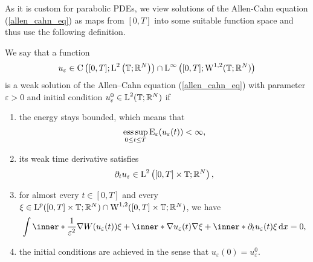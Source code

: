 As it is custom for parabolic PDEs, we view solutions of the Allen-Cahn equation (\ref{allen_cahn_eq}) as maps from $ [0,T] $ into some suitable function space and thus use the following definition.

\begin{definition}
	\label{solution_to_ac}
	We say that a function 
	\begin{equation*}
	u_{ \varepsilon} \in 
	\mathrm{ C } \left( [0 , T ] ; \operatorname{L}^{ 2 } \left( \operatorname{\mathbb{T}}; \mathbb{ R }^{ 
	N } \right) \right) \cap
	\operatorname{L}^{ \infty } \left( [0, T ]; \operatorname{W}^{ 1, 2 } ( \operatorname{\mathbb{T}} ; \mathbb{ R }^{ 
	N } ) \right)
	\end{equation*}
	is a weak solution of the Allen--Cahn equation (\ref{allen_cahn_eq}) with parameter $ \varepsilon > 0 $ and initial condition $ u_{ \varepsilon}^{ 0 } \in \operatorname{L}^{ 2 } ( \operatorname{\mathbb{T}} ; \mathbb{ R }^{ N } ) $ if
	\begin{enumerate}
		\item the energy stays bounded, which means that
		\begin{equation}
			\operatorname*{ess\,sup}_{ 0 \leq t \leq T }
			\operatorname{E}_{ \varepsilon } ( u_{ \varepsilon } ( t ) ) 
			< \infty,
		\end{equation}
		\item 
		its weak time derivative satisfies
		\begin{equation}
			\partial_{ t } u_{ \varepsilon }
			\in
			\operatorname{L}^{ 2 } \left( [ 0 , T ] \times \operatorname{\mathbb{T}} ; \mathbb{ R }^{ N } \right),
		\end{equation}
		\item 
		\label{here_appears_p}
		for almost every $ t \in [ 0 , T ] $ and every 
		$ \xi \in \operatorname{L}^{ p } ( [ 0 , T ] \times \operatorname{\mathbb{T}}; \mathbb{ R }^{ N } ) 
		\cap
		\operatorname{W}^{ 1, 2 } ( [ 0, T ] \times \operatorname{\mathbb{T}} ; \mathbb{ R }^{ N } ) $,
		we have
		\begin{equation}
			\label{ac_weak_equation}
			\int
			\inner*{ \frac{ 1 }{ \varepsilon^{ 2 } } \nabla W ( u_{ \varepsilon} ( t ) ) }{ \xi }
			+
			\inner*{ \nabla u_{ \varepsilon } ( t ) }{ \nabla \xi } 
			+
			\inner*{\partial_{ t } u_{ \varepsilon} ( t ) }{ \xi }
			\dd{x}
			=
			0,
		\end{equation}
		\item 
		the initial conditions are achieved in the sense that $ u_{ \varepsilon } ( 0 ) = u_{ \varepsilon}^{ 0 } $.
	\end{enumerate}
\end{definition}

